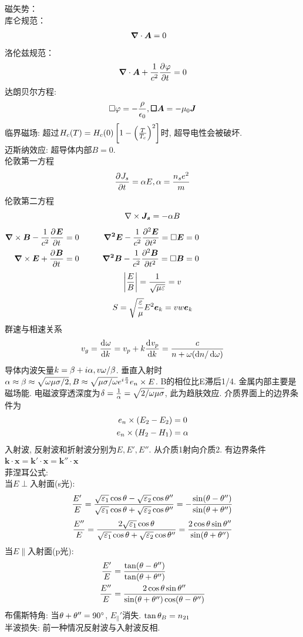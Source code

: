 \documentclass[UTF8,8pt]{ctexart}
\begin{document}
\begin{multicols}{3}
    
    磁矢势：\\
    库仑规范：
    $$\ar{
        \bm{\nabla}\cdot \bm{A} \x 0
    }$$
    洛伦兹规范：
    $$  \bm{\nabla}\cdot\bm{A}+\ff{c^2}\pt{\varphi} = 0$$
    达朗贝尔方程:
    $$\square \varphi = -\f{\rho}{\epsilon_0},\bm{\square A} = -\mu_0\bm{J}$$
    临界磁场: 超过$H_c(T)=H_c(0)\left[1-\of{\f{T}{T_c}}^2\right]$时, 超导电性会被破坏. \\
    迈斯纳效应: 超导体内部$B=0$. \\
    伦敦第一方程
    $$\pp{J_s}{t}=\a E,\a=\f{n_se^2}{m}$$
    伦敦第二方程
    $$\nabla\tm\bm{J_s}=-\a B$$
$\ar{
    \bm{\nabla}\times \bm{B}-\ff{c^2}\pt{\bm{E}} \x  0\quad&\quad \bm{\nabla^2 E}-\ff{c^2}\pt[2]{\bm{E}}=\square \bm{E} \x  0\\
    \bm{\nabla}\times \bm{E}+\pt{\bm{B}} \x  0&\bm{\nabla^2 B}-\ff{c^2}\pt[2]{\bm{B}}=\square \bm{B} \x  0
}$
    $$\abs{\f{E}{B}}=\ff{\sqrt{\mu\ep}}=v$$
    $$S=\sqrt{\f{\ep}{\mu}}E^2\bm{e}_k=vw\bm{e}_k$$
    群速与相速关系
    $$v_g=\dd{\o}{k}=v_p+k\dd{v_p}{k}=\f{c}{n+\o(\d n/\d\o)}$$
    导体内波矢量$k=\b+i\a,v\o/\b$. 垂直入射时$\a\approx\b\approx\sqrt{\o\mu\sg/2}, B\approx \sqrt{\mu\sg/\o}e^{i\f{\pi}{4}}e_n\tm E$. B的相位比E滞后1/4. 金属内部主要是磁场能. 电磁波穿透深度为$\de=\ff{\a}=\sqrt{2/\o\mu\sg}$, 此为趋肤效应. 
    介质界面上的边界条件为
    $$\ar{
        e_n\tm(E_2-E_2)\x0\\
        e_n\tm(H_2-H_1)\x\a
    }$$
    入射波, 反射波和折射波分别为$E,E',E''$. 从介质1射向介质2. 有边界条件$\bm{k\cdot x}=\bm{k'\cdot x}=\bm{k''\cdot x}$\\
    菲涅耳公式:\\
    当$E\perp$入射面(s光):
    \begin{equation}
        \f{E'}{E} = \f{\sqrt{\ep_1}\cos\t-\sqrt{\ep_2}\cos\t''}{\sqrt{\ep_1}\cos\t+\sqrt{\ep_2}\cos\t''}=-\f{\sin(\t-\t'')}{\sin(\t+\t'')}
    \end{equation}
    \begin{equation}
        \f{E''}{E} = \f{2\sqrt{\ep_1}\cos\t}{\sqrt{\ep_1}\cos\t+\sqrt{\ep_2}\cos\t''}=\f{2\cos\t\sin\t''}{\sin(\t+\t'')}
    \end{equation}
    当$E\parallel$入射面(p光):
    $$\ar{
        \f{E'}{E}\x \f{\tan(\t-\t'')}{\tan(\t+\t'')}\\
        \f{E''}{E}\x \f{2\cos\t\sin\t''}{\sin(\t+\t'')\cos(\t-\t'')}
    }$$
    布儒斯特角: 当$\t+\t''=90^\circ$, $E_\parallel'$消失. $\tan\t_B=n_{21}$\\
    半波损失: 前一种情况反射波与入射波反相. \\

\end{multicols}
\end{document}
